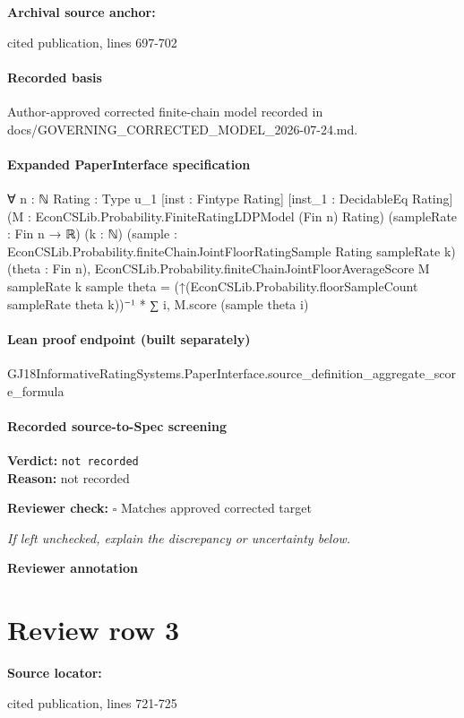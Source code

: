 \documentclass[10pt]{article}
\newcommand{\reviewerbox}{%
  \par\noindent\fbox{\parbox{0.96\linewidth}{\rule{0pt}{0.38in}}}\par
}
\newcommand{\reviewmatch}[1]{%
  \par\noindent\textbf{Reviewer check:} $\square$\; #1\par
  \noindent\emph{If left unchecked, explain the discrepancy or uncertainty below.}\par
}
\begin{document}
\textbf{Archival source anchor:} {\footnotesize\raggedright cited publication, lines 697-\allowbreak{}702\par}
\paragraph{Recorded basis}
Author-\allowbreak{}approved corrected finite-\allowbreak{}chain model recorded in docs/\allowbreak{}GOVERNING\_\allowbreak{}CORRECTED\_\allowbreak{}MODEL\_\allowbreak{}2026-\allowbreak{}07-\allowbreak{}24.\allowbreak{}md.\allowbreak{}
\paragraph{Expanded PaperInterface specification}
\begin{ReviewVerbatim}
∀ {n : ℕ} {Rating : Type u_1} [inst : Fintype Rating] [inst_1 : DecidableEq Rating]
  (M : EconCSLib.Probability.FiniteRatingLDPModel (Fin n) Rating) (sampleRate : Fin n → ℝ) (k : ℕ)
  (sample : EconCSLib.Probability.finiteChainJointFloorRatingSample Rating sampleRate k) (theta : Fin n),
  EconCSLib.Probability.finiteChainJointFloorAverageScore M sampleRate k sample theta =
    (↑(EconCSLib.Probability.floorSampleCount sampleRate theta k))⁻¹ * ∑ i, M.score (sample theta i)
\end{ReviewVerbatim}

\paragraph{Lean proof endpoint (built separately)}\begin{ReviewVerbatim}
GJ18InformativeRatingSystems.PaperInterface.source_definition_aggregate_score_formula
\end{ReviewVerbatim}

\paragraph{Recorded source-to-Spec screening}
\textbf{Verdict:} \texttt{not recorded}
\\
\textbf{Reason:} not recorded
\reviewmatch{Matches approved corrected target}
\noindent\textbf{Reviewer annotation}\par
\reviewerbox
\clearpage
\hypertarget{source-claim-eb16a2642f471c57}{}
\section*{Review row 3}
\textbf{Source locator:} {\footnotesize\raggedright cited publication, lines 721-\allowbreak{}725\par}
\end{document}
